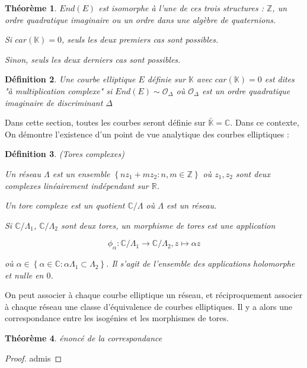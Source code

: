 \documentclass{article}
\newcommand{\Z}[0]{\mathbb{Z}}
\newcommand{\R}[0]{\mathbb{R}}
\newcommand{\C}[0]{\mathbb{C}}
\newcommand{\K}[0]{\mathbb{K}}
\newcommand{\Kb}[0]{\bar{\K}}
\newcommand{\OR}[0]{\mathcal{O}}
\newtheorem{The}{Théorème}[section]
\newtheorem{Def}[The]{Définition}
\begin{document}
\begin{The}
	$End(E)$ est isomorphe à l'une de ces trois structures : $\Z$, un ordre quadratique imaginaire ou un ordre dans une algèbre de quaternions.
	
	Si $car(\K) = 0$, seuls les deux premiers cas sont possibles.
	
	Sinon, seuls les deux derniers cas sont possibles. 
\end{The}

\begin{Def}
	Une courbe elliptique $E$ définie sur $\K$ avec $car(\K) = 0$ est dites "à multiplication complexe" si $End(E)\sim \OR_{\Delta}$ où $\OR_{\Delta}$ est un ordre quadratique imaginaire de discriminant $\Delta$
\end{Def}


Dans cette section, toutes les courbes seront définie sur $\Kb = \C$. Dans ce contexte, On démontre l'existence d'un point de vue analytique des courbes elliptiques :

\begin{Def}
	(Tores complexes)
	
	Un réseau $\Lambda$ est un ensemble $\left\lbrace nz_1 + mz_2 : n,m\in\Z\right\rbrace $ où $z_1 ,z_2$ sont deux complexes linéairement indépendant sur $\R$.
	
	Un tore complexe est un quotient $\C/\Lambda$ où $\Lambda$ est un réseau. 
	
	Si $\C/\Lambda_1$, $\C/\Lambda_2$ sont deux tores, un morphisme de tores est une application 
	
	\begin{equation*}
		\phi_{\alpha} : \C/\Lambda_1 \rightarrow \C/\Lambda_2 , z \mapsto \alpha z
	\end{equation*}
	
	où $\alpha\in\left\lbrace \alpha\in\C : \alpha\Lambda_1 \subset \Lambda_2\right\rbrace $. Il s'agit de l'ensemble des applications holomorphe et nulle en $0$. 
	
\end{Def}

On peut associer à chaque courbe elliptique un réseau, et réciproquement associer à chaque réseau une classe d'équivalence de courbes elliptiques. Il y a alors une correspondance entre les isogénies et les morphismes de tores. 

\begin{The}
	énoncé de la correspondance
\end{The}

\begin{proof}
	admis
\end{proof}
\end{document}
